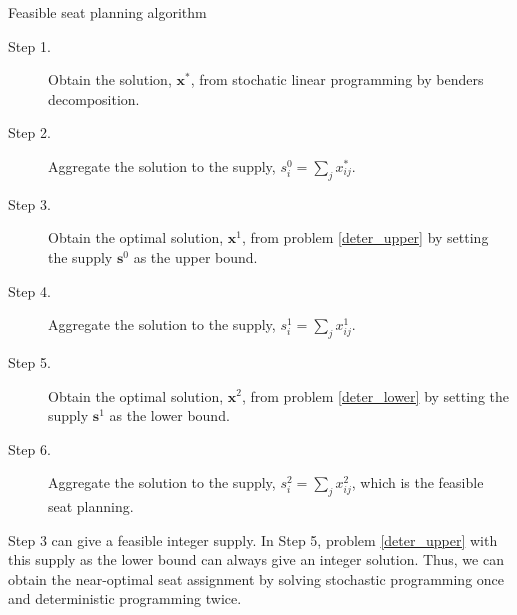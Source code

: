\begin{algorithm}[H]
  \caption{Feasible seat planning algorithm}\label{feasible_seat}
    \begin{description}
    \item[Step 1.] Obtain the solution, $\mathbf{x}^{*}$, from stochatic linear programming by benders decomposition.

    \item[Step 2.] Aggregate the solution to the supply, ${s}_{i}^{0} = \sum_{j} x^{*}_{ij}$.

    \item[Step 3.] Obtain the optimal solution, $\mathbf{x}^{1}$, from problem \eqref{deter_upper} by setting the supply $\mathbf{s}^{0}$ as the upper bound. 
    
    \item[Step 4.] Aggregate the solution to the supply, ${s}_{i}^{1} = \sum_{j} x^{1}_{ij}$.

    \item[Step 5.] Obtain the optimal solution, $\mathbf{x}^{2}$, from problem \eqref{deter_lower} by setting the supply $\mathbf{s}^{1}$ as the lower bound. 
    \item[Step 6.] Aggregate the solution to the supply, ${s}_{i}^{2} = \sum_{j} x^{2}_{ij}$, which is the feasible seat planning.
   \end{description}
  \end{algorithm}

\begin{remark}
  Step 3 can give a feasible integer supply. In Step 5, problem \eqref{deter_upper} with this supply as the lower bound can always give an integer solution.  
  Thus, we can obtain the near-optimal seat assignment by solving stochastic programming once and deterministic programming twice.
  
\end{remark}






